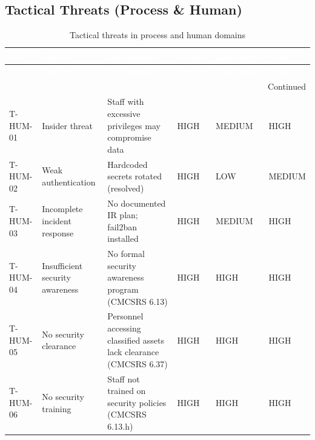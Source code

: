 \subsection{Tactical Threats (Process \& Human)}
\begin{center}
\begin{longtable}{|p{}|p{}|p{}|p{}|p{}|p{}|}
\caption[Tactical Threats]{Tactical threats in process and human domains}
\label{tab:tactical-threats} \\
\hline
\rowcolor{mooveblue}
\textcolor{white}{\textbf{ID}} & \textcolor{white}{\textbf{Threat}} & \textcolor{white}{\textbf{Description}} & \textcolor{white}{\textbf{Impact}} & \textcolor{white}{\textbf{Likelihood}} & \textcolor{white}{\textbf{Risk}} \\
\hline
\endfirsthead
\hline
\rowcolor{mooveblue}
\textcolor{white}{\textbf{ID}} & \textcolor{white}{\textbf{Threat}} & \textcolor{white}{\textbf{Description}} & \textcolor{white}{\textbf{Impact}} & \textcolor{white}{\textbf{Likelihood}} & \textcolor{white}{\textbf{Risk}} \\
\hline
\endhead
\hline
\multicolumn{6}{|r|}{Continued} \\
\hline
\endfoot
\hline
\endlastfoot
T-HUM-01 & Insider threat & Staff with excessive privileges may compromise data & HIGH & MEDIUM & HIGH \\
T-HUM-02 & Weak authentication & Hardcoded secrets rotated (resolved) & HIGH & LOW & MEDIUM \\
T-HUM-03 & Incomplete incident response & No documented IR plan; fail2ban installed & HIGH & MEDIUM & HIGH \\
T-HUM-04 & Insufficient security awareness & No formal security awareness program (CMCSRS 6.13) & HIGH & HIGH & HIGH \\
T-HUM-05 & No security clearance & Personnel accessing classified assets lack clearance (CMCSRS 6.37) & HIGH & HIGH & HIGH \\
T-HUM-06 & No security training & Staff not trained on security policies (CMCSRS 6.13.h) & HIGH & HIGH & HIGH \\
\hline
\end{longtable}
\end{center}

